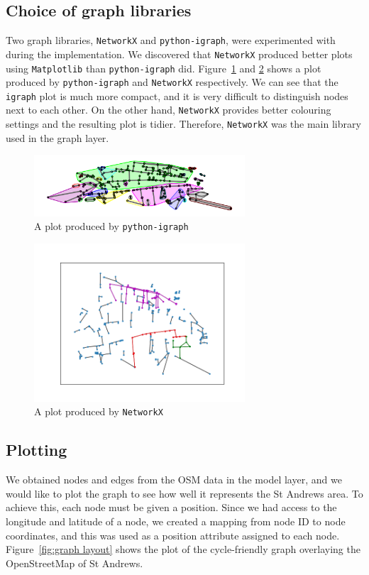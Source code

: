 \documentclass[12pt,a4paper]{report}
\begin{document}
\subsection{Choice of graph libraries}
Two graph libraries, \texttt{NetworkX} and \texttt{python-igraph}, were experimented with during the implementation. We discovered that \texttt{NetworkX} produced better plots using \texttt{Matplotlib} than \texttt{python-igraph} did. Figure~\ref{fig:igraph} and \ref{fig:networkx} shows a plot produced by \texttt{python-igraph} and \texttt{NetworkX} respectively. We can see that the \texttt{igraph} plot is much more compact, and it is very difficult to distinguish nodes next to each other. On the other hand, \texttt{NetworkX} provides better colouring settings and the resulting plot is tidier. Therefore, \texttt{NetworkX} was the main library used in the graph layer.

\begin{figure}[ht]
    \centering
    \includegraphics[width=0.7\textwidth]{plan_images/igraph.png}
    \caption{A plot produced by \texttt{python-igraph}}
    \label{fig:igraph}
\end{figure}

\begin{figure}[ht]
    \centering
    \includegraphics[width=0.7\textwidth,trim={2.5cm 1.5cm 1.7cm 1.7cm},clip]{plan_images/networkx.png}
    \caption{A plot produced by \texttt{NetworkX}}
    \label{fig:networkx}
\end{figure}

\subsection{Plotting}
We obtained nodes and edges from the OSM data in the model layer, and we would like to plot the graph to see how well it represents the St Andrews area. To achieve this, each node must be given a position. Since we had access to the longitude and latitude of a node, we created a mapping from node ID to node coordinates, and this was used as a position attribute assigned to each node. Figure~\ref{fig:graph layout} shows the plot of the cycle-friendly graph overlaying the OpenStreetMap of St Andrews.
\end{document}
